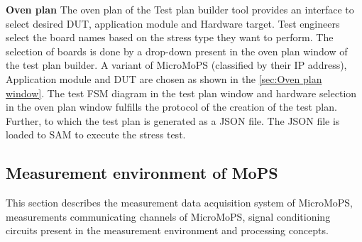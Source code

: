 \textbf{Oven plan} The oven plan of the Test plan builder tool provides an interface to select desired DUT, application module and Hardware target. 
Test engineers select the board names based on the stress type they want to perform. 
The selection of boards is done by a drop-down present in the oven plan window of the test plan builder. 
A variant of MicroMoPS (classified by their IP address), Application module and DUT are chosen as shown in the \cref{sec:Oven plan window}.     
The test FSM diagram in the test plan window and hardware selection in the oven plan window fulfills the protocol of the creation of the test plan. 
Further, to which the test plan is generated as a JSON file. 
The JSON file is loaded to SAM to execute the stress test. %



\subsection{Measurement environment of MoPS}\label{sec:ME}

This section describes the measurement data acquisition system of MicroMoPS, measurements communicating channels of MicroMoPS, signal conditioning circuits present in the measurement environment and processing concepts. 

